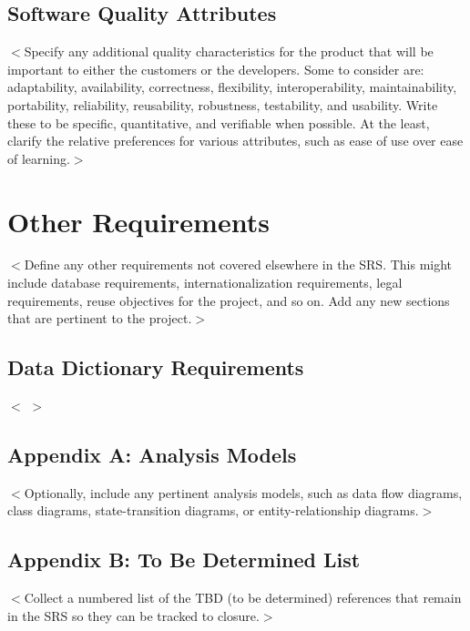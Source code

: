 \documentclass[16pt]{scrreprt}
\begin{document}
\section{Software Quality Attributes}
$<$Specify any additional quality characteristics for the product that will be 
important to either the customers or the developers. Some to consider are: 
adaptability, availability, correctness, flexibility, interoperability, 
maintainability, portability, reliability, reusability, robustness, testability, 
and usability. Write these to be specific, quantitative, and verifiable when 
possible. At the least, clarify the relative preferences for various attributes, 
such as ease of use over ease of learning.$>$



\chapter{Other Requirements}
\label{Other Requirements}
$<$Define any other requirements not covered elsewhere in the SRS. This might 
include database requirements, internationalization requirements, legal 
requirements, reuse objectives for the project, and so on. Add any new sections 
that are pertinent to the project.$>$

\section{Data Dictionary Requirements}
$<$ $>$


\section{Appendix A: Analysis Models}
$<$Optionally, include any pertinent analysis models, such as data flow 
diagrams, class diagrams, state-transition diagrams, or entity-relationship 
diagrams.$>$

\section{Appendix B: To Be Determined List}
$<$Collect a numbered list of the TBD (to be determined) references that remain 
in the SRS so they can be tracked to closure.$>$
\end{document}
